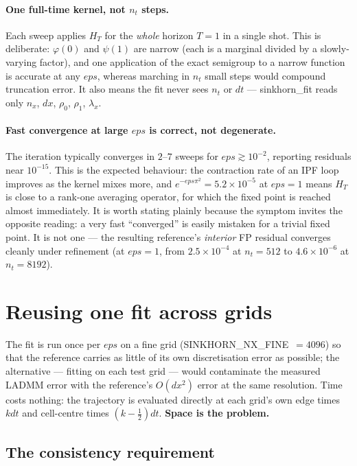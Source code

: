\documentclass[11pt]{article}
\newcommand{\eps}{\varepsilon}
\newcommand{\dt}{\Delta t}
\newcommand{\dx}{\Delta x}
\newcommand{\code}[1]{\texttt{#1}}
\def\eps{eps}\def\dt{dt}\def\dx{dx}\def\code#1{#1}%
\begin{document}
\paragraph{One full-time kernel, not $n_t$ steps.} Each sweep applies $H_T$ for
the \emph{whole} horizon $T=1$ in a single shot. This is deliberate:
$\varphi(0)$ and $\psi(1)$ are narrow (each is a marginal divided by a
slowly-varying factor), and one application of the exact semigroup to a narrow
function is accurate at any $\eps$, whereas marching in $n_t$ small steps would
compound truncation error. It also means the fit never sees $n_t$ or $\dt$ ---
\code{sinkhorn\_fit} reads only $n_x$, $\dx$, $\rho_0$, $\rho_1$, $\lambda_x$.

\paragraph{Fast convergence at large $\eps$ is correct, not degenerate.}
The iteration typically converges in $2$--$7$ sweeps for $\eps\gtrsim10^{-2}$,
reporting residuals near $10^{-15}$. This is the expected behaviour: the
contraction rate of an IPF loop improves as the kernel mixes more, and
$e^{-\eps\pi^2}=5.2\times10^{-5}$ at $\eps=1$ means $H_T$ is close to a
rank-one averaging operator, for which the fixed point is reached almost
immediately. It is worth stating plainly because the symptom invites the
opposite reading: a very fast ``converged'' is easily mistaken for a trivial
fixed point. It is not one --- the resulting reference's \emph{interior} FP
residual converges cleanly under refinement (at $\eps=1$, from
$2.5\times10^{-4}$ at $n_t=512$ to $4.6\times10^{-6}$ at $n_t=8192$).

\section{Reusing one fit across grids}
\label{sec:reduce}

The fit is run once per $\eps$ on a fine grid
(\code{SINKHORN\_NX\_FINE}~$=4096$) so that the reference carries as little of
its own discretisation error as possible; the alternative --- fitting on each
test grid --- would contaminate the measured LADMM error with the reference's
$O(\dx^2)$ error at the same resolution. Time costs nothing: the trajectory is
evaluated directly at each grid's own edge times $k\dt$ and cell-centre times
$(k-\tfrac12)\dt$. \textbf{Space is the problem.}

\subsection{The consistency requirement}
\end{document}
